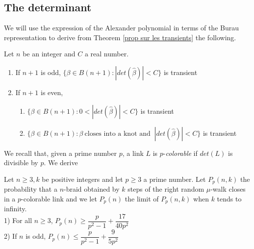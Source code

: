 \documentclass[12pt]{article}
\begin{document}
\subsection{The determinant}\label{resultats determinant}
We will use the expression of the Alexander polynomial in terms of the Burau representation to derive from Theorem \ref{prop sur les transients} the following.

\begin{thm} \label{thm determinant} Let $n$ be an integer and $C$ a real number.
	\begin{enumerate}
		\item
		If $n+1$ is odd, $\{\beta\in B(n+1): |det(\hat{\beta})|<C\}$ is transient
		\item
		If $n+1$ is even, 
		\begin{enumerate}
			\item $\{\beta\in B(n+1): 0<|det(\hat{\beta})|<C\}$ is transient			
			\item $\{\beta\in B(n+1): \beta\ \mbox{closes into a knot and }\ |det(\hat{\beta})|<C\}$ is transient
		\end{enumerate}	
	\end{enumerate}	
\end{thm}
We recall that, given a prime number $p$, a link $L$ is $p$-{\it colorable} if $det(L)$ is divisible by $p$. We derive
\begin{thm} \label{thm color} Let $n\geq 3, k$ be positive integers and let $p\geq 3$ a prime number. Let $P_p(n,k)$ the probability that a $n$-braid obtained by $k$ steps of the right random $\mu$-walk closes in a $p$-colorable link and we let $P_p(n)$ the limit of $P_p(n,k)$ when $k$ tends to infinity.\\
	1) For all $n\geq 3$, $P_p(n)\geq  \dfrac{p}{p^2-1}+\dfrac{17}{40p^2}$\\
	2) If $n$ is odd, 	$P_p(n)\leq  \dfrac{p}{p^2-1}+\dfrac{9}{5p^2}$
\end{thm}
\end{document}

